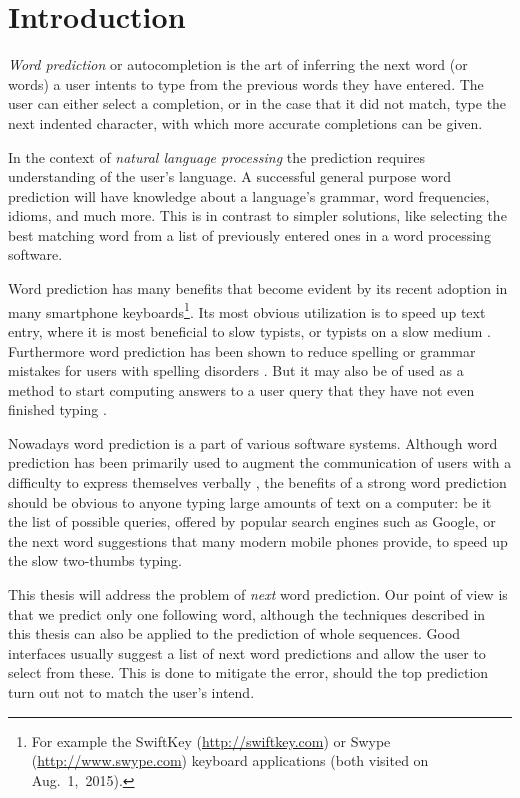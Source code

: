 \chapter{Introduction}
\label{ch:introduction}

\emph{Word prediction} or autocompletion is the art of inferring the next
word (or words) a user intents to type from the previous words they have
entered.
The user can either select a completion, or in the case that it did not
match, type the next indented character, with which more accurate completions
can be given.

In the context of \emph{natural language processing} the prediction requires
understanding of the user's language.
A successful general purpose word prediction will have knowledge about a
language's grammar, word frequencies, idioms, and much more.
This is in contrast to simpler solutions, like selecting the best matching word
from a list of previously entered ones in a word processing software.

Word prediction has many benefits that become evident by its recent adoption
in many smartphone keyboards\footnote{For example the SwiftKey
(\url{http://swiftkey.com}) or Swype (\url{http://www.swype.com}) keyboard
applications (both visited on Aug.~1,~2015).}.
Its most obvious utilization is to speed up text entry, where it is most
beneficial to slow typists, or typists on a slow medium \parencite{Trnka2007}.
Furthermore word prediction has been shown to reduce spelling or grammar
mistakes for users with spelling disorders \parencite{Newell1992}.
But it may also be of used as a method to start computing answers to a user
query that they have not even finished typing \noref.

Nowadays word prediction is a part of various software systems.
Although word prediction has been primarily used to augment the communication of
users with a difficulty to express themselves verbally
\parencite{Swiffin1987,Trnka2011}, the benefits of a strong word prediction
should be obvious to anyone typing large amounts of text on a computer:
be it the list of possible queries, offered by popular search engines such as
Google, or the next word suggestions that many modern mobile phones provide, to
speed up the slow two-thumbs typing.

This thesis will address the problem of \emph{next} word prediction.
Our point of view is that we predict only one following word, although the
techniques described in this thesis can also be applied to the prediction
of whole sequences.
Good interfaces usually suggest a list of next word predictions and allow the
user to select from these.
This is done to mitigate the error, should the top prediction turn out not to
match the user's intend.

